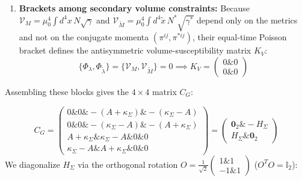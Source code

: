 \documentclass[aps,prd,onecolumn,superscriptaddress,nofootinbib,longbibliography,10pt]{revtex4-2}
\begin{document}
\begin{enumerate}
\[\frac{\partial^2\Sigma_{reg}}{\partial\tilde{\lambda}^2} = \frac{1}{\xi^4 M_5^4}\text{sech}^2(u) + \kappa_\Sigma = A + \kappa_\Sigma\]


Thus the \(2 \times 2\) Hessian matrix \(H_\Sigma\) is
    \[ H_\Sigma = \begin{pmatrix} A + \kappa_\Sigma \& \kappa_\Sigma - A \\ \kappa_\Sigma - A \& A + \kappa_\Sigma \end{pmatrix} \]
    
\item \textbf{Brackets among secondary volume constraints:} Because \(\mathcal{V}_M = \mu_0^4\int d^4x\,N\sqrt{\gamma}\) and \(\mathcal{V}_{\tilde{M}} = \mu_0^4\int d^4\tilde{x}\,N^*\sqrt{\gamma^*}\) depend only on the metrics and not on the conjugate momenta \((\pi^{ij}, \pi^{*ij})\), their equal-time Poisson bracket defines the antisymmetric volume-susceptibility matrix \(K_V\):
    \[ \{\Phi_\lambda, \Phi_{\tilde{\lambda}}\} = \{\mathcal{V}_M, \mathcal{V}_{\tilde{M}}\} = 0 \implies K_V = \begin{pmatrix} 0 \& 0 \\ 0 \& 0 \end{pmatrix} \]
  
\end{enumerate}

  Assembling these blocks gives the \(4 \times 4\) matrix \(C_G\):


  \[ C_G = \begin{pmatrix} 0 \& 0 \& -(A + \kappa_\Sigma) \& -(\kappa_\Sigma - A) \\ 0 \& 0 \& -(\kappa_\Sigma - A) \& -(A + \kappa_\Sigma) \\ A + \kappa_\Sigma \& \kappa_\Sigma - A \& 0 \& 0 \\ \kappa_\Sigma - A \& A + \kappa_\Sigma \& 0 \& 0 \end{pmatrix} = \begin{pmatrix} \mathbf{0}_2 \& -H_\Sigma \\ H_\Sigma \& \mathbf{0}_2 \end{pmatrix} \]
  We diagonalize \(H_\Sigma\) via the orthogonal rotation \(O = \frac{1}{\sqrt{2}}\begin{pmatrix} 1 \& 1 \\ -1 \& 1 \end{pmatrix}\) (\(O^T O = \mathbb{I}_2\)):
\end{document}
